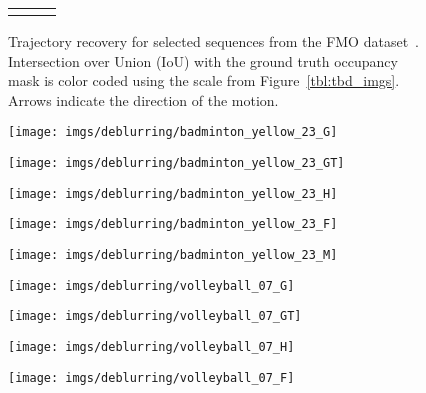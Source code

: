 \documentclass[10pt,twocolumn,letterpaper]{article}
\begin{document}
\begin{figure*}
\begin{tabular}{@{}c@{}c@{}c@{}}
{  \noindent}  \\
\end{tabular}
\caption{Trajectory recovery for selected sequences from the FMO dataset~\cite{fmo}. Intersection over Union (IoU) with the ground truth occupancy mask is color coded using the scale from Figure~\ref{tbl:tbd_imgs}. Arrows indicate the direction of the motion.}
\label{tbl:fmo_imgs}
\end{figure*}
 
\begin{figure}
	\noindent\begin{minipage}[t]{.24\linewidth}
		\centering
		\texttt{[image: imgs/deblurring/badminton\_yellow\_23\_G]}
	\end{minipage}\hfill \begin{minipage}[t]{.24\linewidth}
		\centering
		\texttt{[image: imgs/deblurring/badminton\_yellow\_23\_GT]}
	\end{minipage}\hfill \begin{minipage}[t]{.24\linewidth}
		\centering
		\texttt{[image: imgs/deblurring/badminton\_yellow\_23\_H]}
	\end{minipage}\hfill \begin{minipage}[t]{.12\linewidth}
		\centering
		\texttt{[image: imgs/deblurring/badminton\_yellow\_23\_F]}
	\end{minipage}\hfill \begin{minipage}[t]{.12\linewidth}
		\centering
		\texttt{[image: imgs/deblurring/badminton\_yellow\_23\_M]}
	\end{minipage}
\begin{minipage}[t]{.24\linewidth}
		\centering
		\texttt{[image: imgs/deblurring/volleyball\_07\_G]}
	\end{minipage}\hfill \begin{minipage}[t]{.24\linewidth}
		\centering
		\texttt{[image: imgs/deblurring/volleyball\_07\_GT]}
	\end{minipage}\hfill \begin{minipage}[t]{.24\linewidth}
		\centering
		\texttt{[image: imgs/deblurring/volleyball\_07\_H]}
	\end{minipage}\hfill \begin{minipage}[t]{.12\linewidth}
		\centering
		\texttt{[image: imgs/deblurring/volleyball\_07\_F]}
	\end{minipage}\hfill \begin{minipage}[t]{.12\linewidth}

\end{minipage}
\end{figure}
\end{document}
